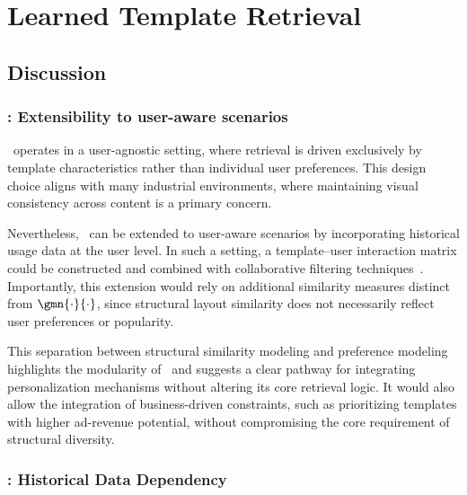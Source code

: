 \chapter{Learned Template Retrieval}
\label{chapter:template}













\section{Discussion}
\label{sec:template-discussion}

\subsection*{\trs: Extensibility to user-aware scenarios}
\label{sec:trs-discussion}

\trs\ operates in a user-agnostic setting, where retrieval is driven exclusively by template characteristics rather than individual user preferences. This design choice aligns with many industrial environments, where maintaining visual consistency across content is a primary concern.

Nevertheless, \trs\ can be extended to user-aware scenarios by incorporating historical usage data at the user level. In such a setting, a template--user interaction matrix could be constructed and combined with collaborative filtering techniques~\cite{cf-techniques}. Importantly, this extension would rely on additional similarity measures distinct from $\gmn{\cdot}{\cdot}$, since structural layout similarity does not necessarily reflect user preferences or popularity.

This separation between structural similarity modeling and preference modeling highlights the modularity of \trs\ and suggests a clear pathway for integrating personalization mechanisms without altering its core retrieval logic. It would also allow the integration of business-driven constraints, such as prioritizing templates with higher ad-revenue potential, without compromising the core requirement of structural diversity.

\subsection*{\neuralmethod: Historical Data Dependency}
\label{sec:gwes-discussion}

